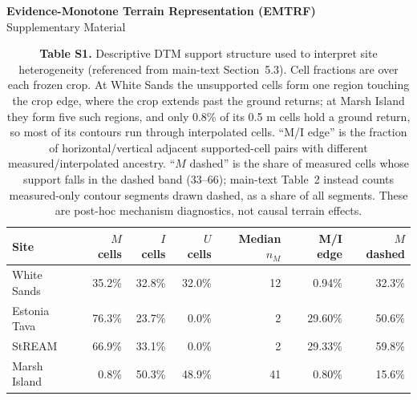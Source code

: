 \documentclass[11pt]{article}
\begin{document}
\setlength{\emergencystretch}{1.5em}
\begin{center}
{\Large\bfseries Evidence-Monotone Terrain Representation (EMTRF)}\\[4pt]
{\large Supplementary Material}
\end{center}
\vspace{6mm}

\begin{table}[!htbp]
\centering
\caption*{\textbf{Table S1.} Descriptive DTM support structure used to interpret site heterogeneity (referenced from main-text Section~5.3). Cell fractions are over each frozen crop. At White Sands the unsupported cells form one region touching the crop edge, where the crop extends past the ground returns; at Marsh Island they form five such regions, and only 0.8\% of its 0.5 m cells hold a ground return, so most of its contours run through interpolated cells. ``M/I edge'' is the fraction of horizontal/vertical adjacent supported-cell pairs with different measured/interpolated ancestry. ``$M$ dashed'' is the share of measured cells whose support falls in the dashed band (33--66); main-text Table~2 instead counts measured-only contour segments drawn dashed, as a share of all segments. These are post-hoc mechanism diagnostics, not causal terrain effects.}
\vspace{2mm}
\small
\setlength{\tabcolsep}{6pt}
\begin{tabular}{@{}lrrrrrr@{}}
\toprule
Site & $M$ cells & $I$ cells & $U$ cells & Median $n_M$ & M/I edge & $M$ dashed \\
\midrule
White Sands & 35.2\% & 32.8\% & 32.0\% & 12 & 0.94\% & 32.3\% \\
Estonia Tava & 76.3\% & 23.7\% & 0.0\% & 2 & 29.60\% & 50.6\% \\
StREAM & 66.9\% & 33.1\% & 0.0\% & 2 & 29.33\% & 59.8\% \\
Marsh Island & 0.8\% & 50.3\% & 48.9\% & 41 & 0.80\% & 15.6\% \\
\bottomrule
\end{tabular}
\end{table}

\vspace{8mm}
\end{document}
